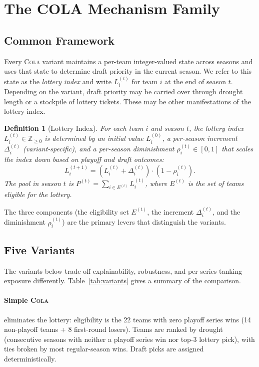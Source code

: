 \documentclass{article}
\newtheorem{definition}{Definition}
\newcommand{\cola}{\textup{\textsc{Cola}}}
\begin{document}
\section{The COLA Mechanism Family}
\label{sec:family}

\subsection{Common Framework}

Every \cola{} variant maintains a per-team integer-valued state across seasons and uses that state to determine draft priority in the current season. We refer to this state as the \emph{lottery index} and write $L_i^{(t)}$ for team $i$ at the end of season $t$. Depending on the variant, draft priority may be carried over through drought length or a stockpile of lottery tickets. These may be other manifestations of the lottery index.

\begin{definition}[Lottery Index]
\label{def:index}
For each team $i$ and season $t$, the lottery index $L_i^{(t)} \in \mathbb{Z}_{\geq 0}$ is determined by an initial value $L_i^{(0)}$, a per-season \emph{increment} $\Delta_i^{(t)}$ (variant-specific), and a per-season \emph{diminishment} $\rho_i^{(t)} \in [0, 1]$ that scales the index down based on playoff and draft outcomes:
\begin{equation*}
L_i^{(t+1)} = \left(L_i^{(t)} + \Delta_i^{(t)}\right) \cdot \left(1 - \rho_i^{(t)}\right).
\end{equation*}
The \emph{pool} in season $t$ is $P^{(t)} = \sum_{i \in E^{(t)}} L_i^{(t)}$, where $E^{(t)}$ is the set of teams eligible for the lottery.
\end{definition}

The three components (the eligibility set $E^{(t)}$, the increment $\Delta_i^{(t)}$, and the diminishment $\rho_i^{(t)}$) are the primary levers that distinguish the variants.

\subsection{Five Variants}

The variants below trade off explainability, robustness, and per-series tanking exposure differently. Table~\ref{tab:variants} gives a summary of the comparison.

\paragraph{Simple \cola{}} eliminates the lottery: eligibility is the 22 teams with zero playoff series wins (14 non-playoff teams + 8 first-round losers). Teams are ranked by drought (consecutive seasons with neither a playoff series win nor top-3 lottery pick), with ties broken by most regular-season wins. Draft picks are assigned deterministically.
\end{document}
